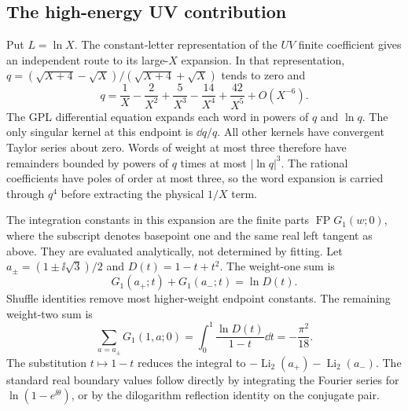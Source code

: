 \subsection{The high-energy UV contribution}
Put $L=\ln X$. The constant-letter representation of the $UV$ finite coefficient gives
an independent route to its large-$X$ expansion.  In that representation,
$q=(\sqrt{X+4}-\sqrt{X})/(\sqrt{X+4}+\sqrt{X})$ tends to zero and
\begin{equation}
 q=\frac1X-\frac2{X^2}+\frac5{X^3}-\frac{14}{X^4}
                       +\frac{42}{X^5}+O(X^{-6}).
\end{equation}
The GPL differential equation expands each word in powers of $q$ and
$\ln q$.  The only singular kernel at this endpoint is $\dd q/q$.
All other kernels have convergent Taylor series about zero.  Words of
weight at most three therefore have remainders bounded by powers of
$q$ times at most $|\ln q|^3$.  The rational coefficients have poles
of order at most three, so the word expansion is carried through $q^4$
before extracting the physical $1/X$ term.

The integration constants in this expansion are the finite parts
$\operatorname{FP}G_1(w;0)$, where the subscript denotes basepoint one
and the same real left tangent as above.  They are evaluated analytically,
not determined by fitting.  Let
$a_\pm=(1\pm\ii\sqrt3)/2$ and $D(t)=1-t+t^2$.
The weight-one sum is
\begin{equation}
 G_1(a_+;t)+G_1(a_-;t)=\ln D(t).
\end{equation}
Shuffle identities remove most higher-weight endpoint constants.
The remaining weight-two sum is
\begin{equation}
 \sum_{a=a_\pm}G_1(1,a;0)
 =\int_0^1\frac{\ln D(t)}{1-t}\dd t
 =-\frac{\pi^2}{18}.
\end{equation}
The substitution $t\mapsto1-t$ reduces the integral to
$-\operatorname{Li}_2(a_+)-\operatorname{Li}_2(a_-)$.
The standard real boundary values follow directly by integrating the
Fourier series for $\ln(1-e^{\ii\theta})$, or by the dilogarithm
reflection identity on the conjugate pair.


